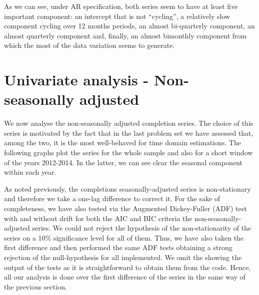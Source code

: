 \documentclass[12pt]{article} %
\begin{document}
As we can see, under AR specification, both series seem to have at least five important component: an intercept that is not ``cycling'', a relatively slow component cycling over 12 months periods, an almost bi-quarterly component, an almost quarterly component and, finally, an almost bimonthly component from which the most of the data variation seems to generate.



\section{Univariate analysis - Non-seasonally adjusted}

We now analyse the non-seasonally adjusted completion series. The choice of this series is motivated by the fact that in the last problem set we have assessed that, among the two, it is the most well-behaved for time domain estimations. The following graphs plot the series for the whole sample and also for a short window of the years 2012-2014. In the latter, we can see clear the seasonal component within each year. 




As noted previously, the completions seasonally-adjusted series is non-stationary and therefore we take a one-lag difference to correct it. For the sake of completeness, we have also tested via the Augmented Dickey-Fuller (ADF) test with and without drift for both the AIC and BIC criteria the non-seasonally-adjusted series. We could not reject the hypothesis of the non-stationarity of the series on a 10\% significance level for all of them. Thus, we have also taken the first difference and then performed the same ADF tests obtaining a strong rejection of the null-hypothesis for all implemented. We omit the showing the output of the tests as it is straightforward to obtain them from the code. Hence, all our analysis is done over the first difference of the series in the same way of the previous section.
\end{document}
